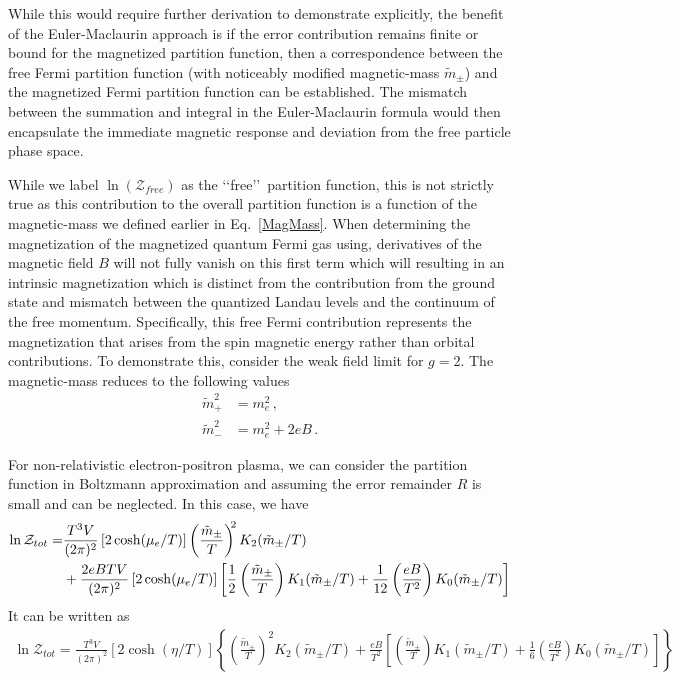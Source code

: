 \documentclass[Universe,article,submit,moreauthors,pdftex]{Definitions/mdpi}
\newcommand*{\req}[1]{Eq.~{\eqref{#1}}}
\begin{document}
While this would require further derivation to demonstrate explicitly, the benefit of the Euler-Maclaurin approach is if the error contribution remains finite or bound for the magnetized partition function, then a correspondence between the free Fermi partition function (with noticeably modified magnetic-mass $\tilde{m}_{\pm}$) and the magnetized Fermi partition function can be established. The mismatch between the summation and integral in the Euler-Maclaurin formula would then encapsulate the immediate magnetic response and deviation from the free particle phase space.

While we label $\ln(\mathcal{Z}_{free})$ as the \lq\lq free\rq\rq\ partition function, this is not strictly true as this contribution to the overall partition function is a function of the magnetic-mass we defined earlier in \req{MagMass}. When determining the magnetization of the magnetized quantum Fermi gas using, derivatives of the magnetic field $B$ will not fully vanish on this first term which will resulting in an intrinsic magnetization which is distinct from the contribution from the ground state and mismatch between the quantized Landau levels and the continuum of the free momentum. Specifically, this free Fermi contribution represents the magnetization that arises from the spin magnetic energy rather than orbital contributions. To demonstrate this, consider the weak field limit for $g=2$. The magnetic-mass reduces to the following values
\begin{align}
  \label{MagMassPlus} \tilde{m}_{+}^{2}&=m_{e}^{2}\,,\\
  \label{MagMassMinus} \tilde{m}_{-}^{2}&=m_{e}^{2}+2eB\,.
\end{align}

For non-relativistic electron-positron plasma, we can consider the partition function in Boltzmann approximation and assuming the error remainder $R$ is small and can be neglected. In this case, we have
\begin{align}
\ln\mathcal{Z}_{tot}=&\frac{T^3V}{(2\pi)^2}\left[2\cosh(\mu_e/T)\right]\left(\frac{\tilde m_\pm}{T}\right)^{\!\!2} K_2(\tilde m_\pm/T)\notag\\
&+\frac{2eBTV}{(2\pi)^2}\left[2\cosh(\mu_e/T)\right]\left[\frac{1}{2}\left(\frac{\tilde m_\pm}{T}\right)K_1(\tilde m_\pm/T)+\frac{1}{12}\left(\frac{eB}{T^2}\right)K_0(\tilde m_\pm/T)\right]
\end{align}
It can be written as
\begin{align}\label{lnZ}
\ln\mathcal{Z}_{tot}=\frac{T^3V}{(2\pi)^2}\left[2\cosh(\eta/T)\right]\left\{\left(\frac{\tilde m_\pm}{T}\right)^{\!\!2} K_2(\tilde m_\pm/T)+\frac{eB}{T^2} \left[\left(\frac{\tilde m_\pm}{T}\right)K_1(\tilde m_\pm/T)+\frac{1}{6}\left(\frac{eB}{T^2}\right)K_0(\tilde m_\pm/T)\right]
\right\}
\end{align}
\end{document}
